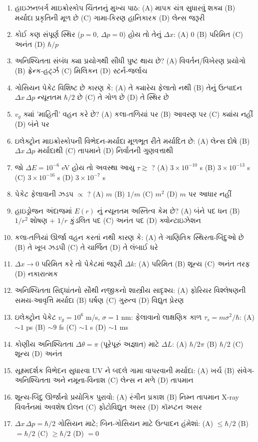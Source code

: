 \begin{enumerate}[label=\textbf{\arabic*.}]
  \item હાઇઝનબર્ગ માઇક્રોસ્કોપ ચિંતનનું મુખ્ય પાઠ: (A) માપક યંત્ર સુધારવું શક્ય (B) મર્યાદા પ્રકૃતિની મૂળ છે (C) ગામા-કિરણ હાનિકારક (D) લેન્સ જરૂરી
  \item કોઈ કણ સંપૂર્ણ સ્થિર ($p=0$, $\Delta p=0$) હોય તો તેનું $\Delta x$: (A) $0$ (B) પરિમિત (C) અનંત (D) $\hbar/p$
  \item અનિશ્ચિતતા સંબંધ ક્યા પ્રયોગથી સીધી પુષ્ટ થાય છે? (A) વિવર્તન/વિખેરણ પ્રયોગો (B) ફ્રેન્ક-હર્ટ્ઝ (C) મિલિકન (D) સ્ટર્ન-જર્લાચ
  \item ગોસિયન પેકેટ વિશિષ્ટ છે કારણ કે: (A) તે ક્યારેય ફેલાતો નથી (B) તેનું ઉત્પાદન $\Delta x\,\Delta p$ ન્યૂનતમ $\hbar/2$ છે (C) તે ગોળ છે (D) તે સ્થિર છે
  \item $v_g$ ક્યાં 'માહિતી' વહન કરે છે? (A) કલા-તળિયાં પર (B) આવરણ પર (C) ક્યાંય નહીં (D) બંને પર
  \item ઇલેક્ટ્રોન માઇક્રોસ્કોપની વિભેદન-મર્યાદા મૂળભૂત રીતે મર્યાદિત છે: (A) લેન્સ દોષે (B) $\Delta x\,\Delta p$ મર્યાદાથી (C) તાપમાને (D) નિર્વાતની ગુણવત્તાથી
  \item જો $\Delta E=10^{-6}$ eV હોય તો અવસ્થા આયુ $\tau\gtrsim$ ? (A) $3\times10^{-10}$ s (B) $3\times10^{-13}$ s (C) $3\times10^{-16}$ s (D) $3\times10^{-7}$ s
  \item પેકેટ ફેલાવાની ઝડપ $\propto$ ? (A) $m$ (B) $1/m$ (C) $m^{2}$ (D) $m$ પર આધાર નહીં
  \item હાઇડ્રોજન અંદાજમાં $E(r)$ નું ન્યૂનતમ અસ્તિત્વ કેમ છે? (A) બંને પદ ધન (B) $1/r^{2}$ શોષણ + $1/r$ કુંડલિત પદ (C) અનંત પદ (D) ક્વોન્ટાઇઝેશન
  \item કલા-તળિયાં ઊર્જા વહન કરતાં નથી કારણ કે: (A) તે ગાણિતિક સ્થિરતા-બિંદુઓ છે (B) તે ખૂબ ઝડપી (C) તે ચાર્જિત (D) તે લંબાઈ ધરે
  \item $\Delta x\to0$ પરિમિત કરે તો પેકેટમાં જરૂરી $\Delta k$: (A) પરિમિત (B) શૂન્ય (C) અનંત તરફ (D) નકારાત્મક
  \item અનિશ્ચિતતા સિદ્ધાંતનો સૌથી નજીકનો શાસ્ત્રીય સાદૃશ્ય: (A) ફોરિયર વિશ્લેષણની સમય-આવૃત્તિ મર્યાદા (B) ઘર્ષણ (C) ગુરુત્વ (D) વિદ્યુત પ્રેરણ
  \item ઇલેક્ટ્રોન પેકેટ $v_g=10^6$ m/s, $\sigma=1$ nm: ફેલાવાનો લાક્ષણિક કાળ $\tau_s=m\sigma^2/\hbar$: (A) $\sim1$ ps (B) $\sim9$ fs (C) $\sim1$ s (D) $\sim1$ ms
  \item કોણીય અનિશ્ચિતતા $\Delta\theta=\pi$ (પૂરેપૂરું અજ્ઞાત) માટે $\Delta L$: (A) $\hbar/2\pi$ (B) $\hbar/2$ (C) શૂન્ય (D) અનંત
  \item સૂક્ષ્મદર્શક વિભેદન સુધારવા UV ને બદલે ગામા વાપરવાની મર્યાદા: (A) ખર્ચ (B) સંવેગ-અનિશ્ચિતતા અને નમૂના-વિનાશ (C) લેન્સ ન મળે (D) તાપમાન
  \item શૂન્ય-બિંદુ ઊર્જાનો પ્રયોગિક પુરાવો: (A) રંગીન પ્રકાશ (B) નિમ્ન તાપમાન X-ray વિવર્તનમાં અવશેષ દોલન (C) ફોટોવિદ્યુત અસર (D) કૉમ્પ્ટન અસર
  \item $\Delta x\,\Delta p=\hbar/2$ ગોસિયન માટે; બિન-ગોસિયન માટે ઉત્પાદન હંમેશાં: (A) $\le\hbar/2$ (B) $=\hbar/2$ (C) $\ge\hbar/2$ (D) $=0$
\end{enumerate}

